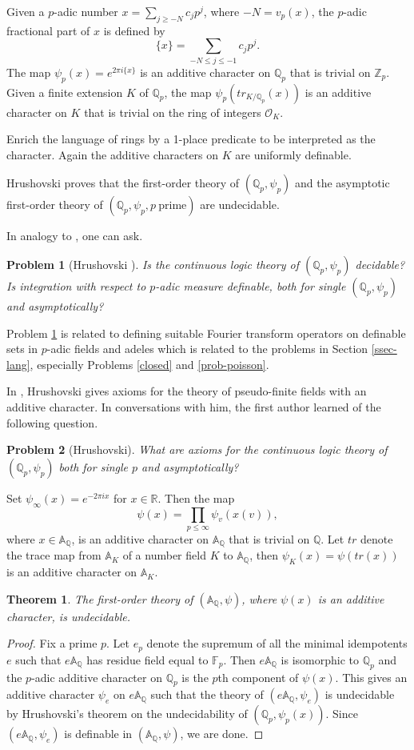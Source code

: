 \documentclass[12pt]{amsart}
\def\A{\mathbb{A}}
\def\R{\mathbb{R}}
\def\F{\mathbb{F}}
\def\Z{\mathbb{Z}}
\def\R{\mathbb{R}}
\def\Q{\mathbb{Q}}
\def\F{\mathbb{F}}
\def\cO{\mathcal{O}}
\newtheorem{thm}{Theorem}[section]
\numberwithin{equation}{section}
\newtheorem{prob}{Problem}[section]
\begin{document}
Given a $p$-adic number $x=\sum_{j\geq -N} c_j p^j$, where $-N=v_p(x)$, 
the $p$-adic fractional part of $x$ is defined by $$\{x\}=\sum_{-N\leq j\leq -1} c_jp^j.$$
The map 
$\psi_p(x)=e^{2\pi i \{x\}}$ is an additive character on $\Q_p$ that is trivial on $\Z_p$. Given a finite extension 
$K$ of $\Q_p$, the map $\psi_p(tr_{K/\Q_p}(x))$ is an additive character on $K$ that is trivial on the ring of integers 
$\cO_K$. 

Enrich the language of rings by a 1-place predicate to be interpreted as the character. Again the additive characters on $K$ are uniformly definable.

Hrushovski \cite{udi-char} proves that the first-order theory of $(\Q_p,\psi_p)$ and the asymptotic first-order theory of $(\Q_p,\psi_p, p~\text{prime})$ are undecidable. 

In analogy to \cite{udi-char}, one can ask.

\begin{prob}[Hrushovski {\cite{udi-char}}] \label{udi-prob} Is the continuous logic theory of $(\Q_p,\psi_p)$ decidable?
Is integration with respect to $p$-adic measure definable, both for single $(\Q_p,\psi_p)$ and asymptotically?
\end{prob}

Problem \ref{udi-prob} is related to defining suitable Fourier transform operators on definable sets in $p$-adic fields and adeles which is related to the problems in Section \ref{ssec-lang}, especially Problems \ref{closed} and \ref{prob-poisson}.

In \cite{udi-char}, Hrushovski gives axioms for the theory of pseudo-finite fields with an additive character. In conversations with him, the first author learned of the following question.
\begin{prob}[Hrushovski] What are axioms for the continuous logic theory of $(\Q_p,\psi_p)$ both for single $p$ and 
asymptotically?
\end{prob}

Set $\psi_{\infty}(x)=e^{-2\pi ix}$ for $x\in \R$. Then the map 
$$\psi(x)=\prod_{p\leq \infty} \psi_v(x(v)),$$
where $x\in \A_{\Q}$, is an additive character on $\A_{\Q}$ that is trivial on $\Q$. Let $tr$ denote the trace map from 
$\A_K$ of a number field $K$ to $\A_{\Q}$, then $\psi_K(x)=\psi(tr(x))$ is an additive character on $\A_K$.

\begin{thm}\label{ad-char} The first-order theory of $(\A_{\Q},\psi)$, where $\psi(x)$ is an additive character, is undecidable.\end{thm}
\begin{proof} Fix a prime $p$. Let $e_p$ denote the supremum of all the minimal idempotents $e$ such that $e\A_{\Q}$ has residue field 
equal to $\F_p$. Then $e\A_{\Q}$ is isomorphic to $\Q_p$ and the $p$-adic additive character on $\Q_p$ is the $p$th component of $\psi(x)$. This 
gives an additive character $\psi_e$ on $e\A_{\Q}$ such that the theory of $(e\A_{\Q},\psi_e)$ is undecidable by Hrushovski's theorem \cite{udi-char} 
on the undecidability of $(\Q_p,\psi_p(x))$. Since $(e\A_{\Q},\psi_e)$ is definable in $(\A_{\Q},\psi)$, we are done.
\end{proof}
\end{document}
